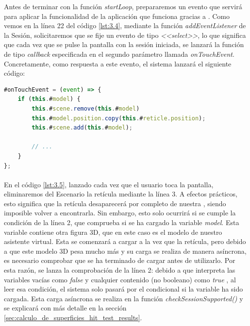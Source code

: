 \documentclass{subfiles}
\begin{document}
        Antes de terminar con la función \textit{startLoop}, prepararemos un evento que servirá para aplicar la funcionalidad de la aplicación que funciona gracias a \hittest. Como vemos en la línea 22 del código \ref{lst:3.4}, mediante la función \textit{addEventListener} de la Sesión, solicitaremos que se fije un evento de tipo \textit{<<select>>}, lo que significa que cada vez que se pulse la pantalla con la sesión iniciada, se lanzará la función de tipo \textit{callback} especificada en el segundo parámetro llamada \textit{onTouchEvent}. Concretamente, como respuesta a este evento, el sistema lanzará el siguiente código:

\begin{lstlisting}[language=JavaScript, caption={Respuesta al evento de tipo <<select>>.}, label={lst:3.5}]
#onTouchEvent = (event) => {
    if (this.#model) {
        this.#scene.remove(this.#model)
        this.#model.position.copy(this.#reticle.position);
        this.#scene.add(this.#model);
        
        // ...
    }
};
\end{lstlisting}

        \paragraph{}
        En el código \ref{lst:3.5}, lanzado cada vez que el usuario toca la pantalla, eliminaremos del Escenario la retícula mediante la línea 3. A efectos prácticos, esto significa que la retícula desaparecerá por completo de nuestra \ra, siendo imposible volver a encontrarla. Sin embargo, esto solo ocurrirá si se cumple la condición de la línea 2, que comprueba si se ha cargado la variable \textit{model}. Esta variable contiene otra figura 3D, que en este caso es el modelo de nuestro asistente virtual. Esta se comenzará a cargar a la vez que la retícula, pero debido a que este modelo 3D pesa mucho más y su carga se realiza de manera asíncrona, es necesario comprobar que se ha terminado de cargar antes de utilizarlo. Por esta razón, se lanza la comprobación de la línea 2: debido a que \js interpreta las variables vacías como \textit{false} y cualquier contenido (no booleano) como \textit{true} \cite{web:mozilla_booleanevaluation}, al leer esa condición, el sistema solo pasará por el condicional si la variable ha sido cargada. Esta carga asíncrona se realiza en la función \textit{checkSessionSupported()} y se explicará con más detalle en la sección \ref{sec:calculo_de_superficies_hit_test_results}.
        
\end{document}
